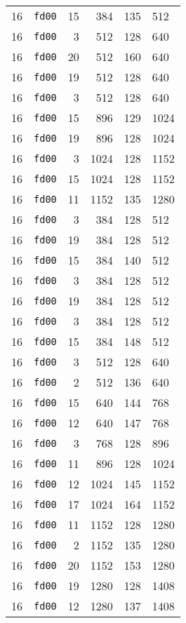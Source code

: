 \documentclass{article}
\begin{document}
\begin{table}[h!]
\begin{tabular}{llrrrl}
    16 & \texttt{fd00} & 15 & 384 & 135 & 512 \\
    16 & \texttt{fd00} & 3 & 512 & 128 & 640 \\
    16 & \texttt{fd00} & 20 & 512 & 160 & 640 \\
    16 & \texttt{fd00} & 19 & 512 & 128 & 640 \\
    16 & \texttt{fd00} & 3 & 512 & 128 & 640 \\
    16 & \texttt{fd00} & 15 & 896 & 129 & 1024 \\
    16 & \texttt{fd00} & 19 & 896 & 128 & 1024 \\
    16 & \texttt{fd00} & 3 & 1024 & 128 & 1152 \\
    16 & \texttt{fd00} & 15 & 1024 & 128 & 1152 \\
    16 & \texttt{fd00} & 11 & 1152 & 135 & 1280 \\
    16 & \texttt{fd00} & 3 & 384 & 128 & 512 \\
    16 & \texttt{fd00} & 19 & 384 & 128 & 512 \\
    16 & \texttt{fd00} & 15 & 384 & 140 & 512 \\
    16 & \texttt{fd00} & 3 & 384 & 128 & 512 \\
    16 & \texttt{fd00} & 19 & 384 & 128 & 512 \\
    16 & \texttt{fd00} & 3 & 384 & 128 & 512 \\
    16 & \texttt{fd00} & 15 & 384 & 148 & 512 \\
    16 & \texttt{fd00} & 3 & 512 & 128 & 640 \\
    16 & \texttt{fd00} & 2 & 512 & 136 & 640 \\
    16 & \texttt{fd00} & 15 & 640 & 144 & 768 \\
    16 & \texttt{fd00} & 12 & 640 & 147 & 768 \\
    16 & \texttt{fd00} & 3 & 768 & 128 & 896 \\
    16 & \texttt{fd00} & 11 & 896 & 128 & 1024 \\
    16 & \texttt{fd00} & 12 & 1024 & 145 & 1152 \\
    16 & \texttt{fd00} & 17 & 1024 & 164 & 1152 \\
    16 & \texttt{fd00} & 11 & 1152 & 128 & 1280 \\
    16 & \texttt{fd00} & 2 & 1152 & 135 & 1280 \\
    16 & \texttt{fd00} & 20 & 1152 & 153 & 1280 \\
    16 & \texttt{fd00} & 19 & 1280 & 128 & 1408 \\
    16 & \texttt{fd00} & 12 & 1280 & 137 & 1408 \\

\end{tabular}
\end{table}
\end{document}
